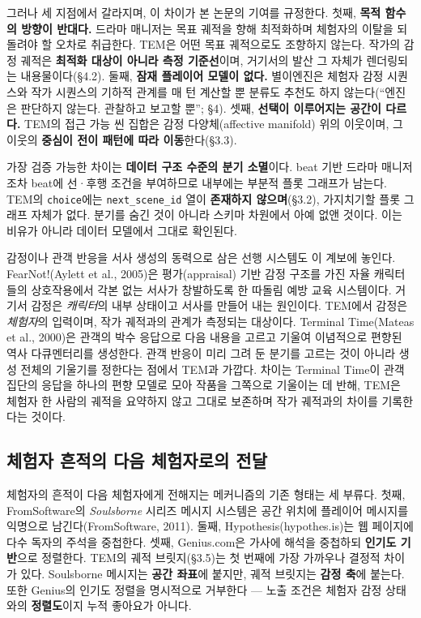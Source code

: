 \documentclass[11pt, a4paper]{article}
\begin{document}
그러나 세 지점에서 갈라지며, 이 차이가 본 논문의 기여를 규정한다. 첫째, \textbf{목적 함수의 방향이 반대다.} 드라마 매니저는 목표 궤적을 향해 최적화하며 체험자의 이탈을 되돌려야 할 오차로 취급한다. TEM은 어떤 목표 궤적으로도 조향하지 않는다. 작가의 감정 궤적은 \textbf{최적화 대상이 아니라 측정 기준선}이며, 거기서의 발산 그 자체가 렌더링되는 내용물이다(\S4.2). 둘째, \textbf{잠재 플레이어 모델이 없다.} 별이엔진은 체험자 감정 시퀀스와 작가 시퀀스의 기하적 관계를 매 턴 계산할 뿐 분류도 추천도 하지 않는다(``엔진은 판단하지 않는다. 관찰하고 보고할 뿐''; \S4). 셋째, \textbf{선택이 이루어지는 공간이 다르다.} TEM의 접근 가능 씬 집합은 감정 다양체(affective manifold) 위의 이웃이며, 그 이웃의 \textbf{중심이 전이 패턴에 따라 이동}한다(\S3.3).

가장 검증 가능한 차이는 \textbf{데이터 구조 수준의 분기 소멸}이다. beat 기반 드라마 매니저조차 beat에 선·후행 조건을 부여하므로 내부에는 부분적 플롯 그래프가 남는다. TEM의 \texttt{choice}에는 \texttt{next\_scene\_id} 열이 \textbf{존재하지 않으며}(\S3.2), 가지치기할 플롯 그래프 자체가 없다. 분기를 숨긴 것이 아니라 스키마 차원에서 아예 없앤 것이다. 이는 비유가 아니라 데이터 모델에서 그대로 확인된다.

감정이나 관객 반응을 서사 생성의 동력으로 삼은 선행 시스템도 이 계보에 놓인다. FearNot!(Aylett et al., 2005)은 평가(appraisal) 기반 감정 구조를 가진 자율 캐릭터들의 상호작용에서 각본 없는 서사가 창발하도록 한 따돌림 예방 교육 시스템이다. 거기서 감정은 \textit{캐릭터}의 내부 상태이고 서사를 만들어 내는 원인이다. TEM에서 감정은 \textit{체험자}의 입력이며, 작가 궤적과의 관계가 측정되는 대상이다. Terminal Time(Mateas et al., 2000)은 관객의 박수 응답으로 다음 내용을 고르고 기울여 이념적으로 편향된 역사 다큐멘터리를 생성한다. 관객 반응이 미리 그려 둔 분기를 고르는 것이 아니라 생성 전체의 기울기를 정한다는 점에서 TEM과 가깝다. 차이는 Terminal Time이 관객 집단의 응답을 하나의 편향 모델로 모아 작품을 그쪽으로 기울이는 데 반해, TEM은 체험자 한 사람의 궤적을 요약하지 않고 그대로 보존하며 작가 궤적과의 차이를 기록한다는 것이다.

\subsection{체험자 흔적의 다음 체험자로의 전달}

체험자의 흔적이 다음 체험자에게 전해지는 메커니즘의 기존 형태는 세 부류다. 첫째, FromSoftware의 \textit{Soulsborne} 시리즈 메시지 시스템은 공간 위치에 플레이어 메시지를 익명으로 남긴다(FromSoftware, 2011). 둘째, Hypothesis(hypothes.is)는 웹 페이지에 다수 독자의 주석을 중첩한다. 셋째, Genius.com은 가사에 해석을 중첩하되 \textbf{인기도 기반}으로 정렬한다. TEM의 궤적 브릿지(\S3.5)는 첫 번째에 가장 가까우나 결정적 차이가 있다. Soulsborne 메시지는 \textbf{공간 좌표}에 붙지만, 궤적 브릿지는 \textbf{감정 축}에 붙는다. 또한 Genius의 인기도 정렬을 명시적으로 거부한다 --- 노출 조건은 체험자 감정 상태와의 \textbf{정렬도}이지 누적 좋아요가 아니다.
\end{document}
